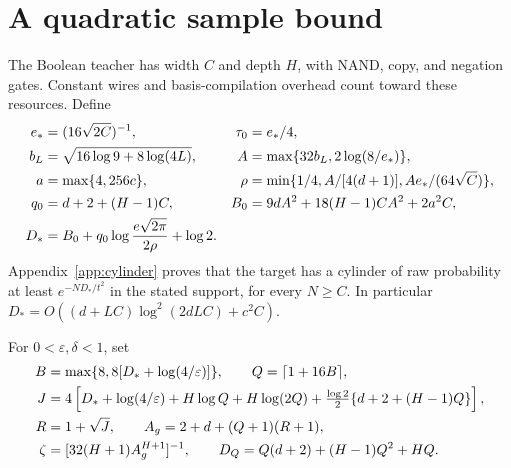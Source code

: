 \documentclass[11pt]{article}
\begin{document}
\section{A quadratic sample bound}

The Boolean teacher has width $C$ and depth $H$, with NAND, copy, and
negation gates. Constant wires and basis-compilation overhead count toward
these resources. Define
\begin{align}
 e_*&=(16\sqrt{2C})^{-1},&\tau_0&=e_*/4,\notag\\
 b_L&=\sqrt{16\log9+8\log(4L)},&A&=\max\{32b_L,2\log(8/e_*)\},\notag\\
 a&=\max\{4,256c\},&\rho&=\min\{1/4,A/[4(d+1)],Ae_*/(64\sqrt C)\},\notag\\
 q_0&=d+2+(H-1)C,&B_0&=9dA^2+18(H-1)CA^2+2a^2C,\notag\\
 D_*&=B_0+q_0\log\frac{e\sqrt{2\pi}}{2\rho}+\log2.
 \label{eq:target-constants}
\end{align}
Appendix~\ref{app:cylinder} proves that the target has a cylinder of raw
probability at least $e^{-ND_*/t^2}$ in the stated support, for every
$N\ge C$. In particular
$D_*=O((d+LC)\log^2(2dLC)+c^2C)$.

For $0<\varepsilon,\delta<1$, set
\begin{align}
 B&=\max\{8,8[D_*+\log(4/\varepsilon)]\},\qquad Q=\lceil1+16B\rceil,\notag\\
 J&=4\left[D_*+\log(4/\varepsilon)+H\log Q+H\log(2Q)
       +\tfrac{\log2}{2}\{d+2+(H-1)Q\}\right],\notag\\
 R&=1+\sqrt J,\qquad A_g=2+d+(Q+1)(R+1),\notag\\
 \zeta&=[32(H+1)A_g^{H+1}]^{-1},\qquad
 D_Q=Q(d+2)+(H-1)Q^2+HQ.\label{eq:budget}
\end{align}
\end{document}
